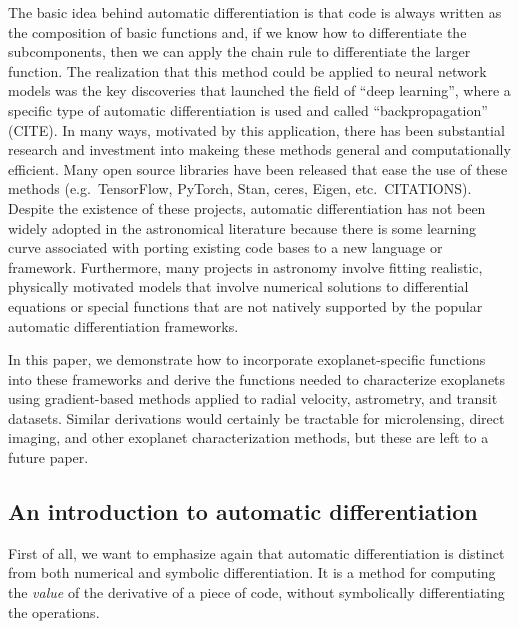 \documentclass[modern]{aastex62}
\begin{document}
The basic idea behind automatic differentiation is that code is always written
as the composition of basic functions and, if we know how to differentiate the
subcomponents, then we can apply the chain rule to differentiate the larger
function.
The realization that this method could be applied to neural network models was the key discoveries that launched the field of ``deep learning'', where a specific type of automatic differentiation is used and called ``backpropagation'' (CITE).
In many ways, motivated by this application, there has been substantial research and investment into makeing these methods general and computationally efficient.
Many open source libraries have been released that ease the use of these methods (e.g.\ TensorFlow, PyTorch, Stan, ceres, Eigen, etc.\ CITATIONS).
Despite the existence of these projects, automatic differentiation has not
been widely adopted in the astronomical literature because there is some
learning curve associated with porting existing code bases to a new language
or framework.
Furthermore, many projects in astronomy involve fitting realistic, physically
motivated models that involve numerical solutions to differential equations
or special functions that are not natively supported by the popular automatic
differentiation frameworks.

In this paper, we demonstrate how to incorporate exoplanet-specific functions
into these frameworks and derive the functions needed to characterize
exoplanets using gradient-based methods applied to radial velocity,
astrometry, and transit datasets.
Similar derivations would certainly be tractable for microlensing, direct
imaging, and other exoplanet characterization methods, but these are left to a
future paper.

\subsection{An introduction to automatic differentiation}


First of all, we want to emphasize again that automatic differentiation is distinct from both numerical and symbolic differentiation.
It is a method for computing the \emph{value} of the derivative of a piece of code, without symbolically differentiating the operations.
\end{document}
